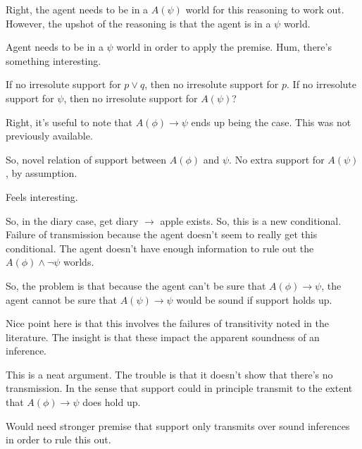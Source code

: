 \documentclass[10pt]{article}
\begin{document}
\begin{note}[Note]
  Right, the agent needs to be in a \(A(\psi)\) world for this reasoning to work out.
  However, the upshot of the reasoning is that the agent is in a \(\psi\) world.

  Agent needs to be in a \(\psi\) world in order to apply the premise.
  Hum, there's something interesting.

  If no irresolute support for \(p \lor q\), then no irresolute support for \(p\).
  If no irresolute support for \(\psi\), then no irresolute support for \(A(\psi)\)?

  Right, it's useful to note that \(A(\phi) \rightarrow \psi\) ends up being the case.
  This was not previously available.

  So, novel relation of support between \(A(\phi)\) and \(\psi\).
  No extra support for \(A(\psi)\), by assumption.

  Feels interesting.

  So, in the diary case, get diary \(\rightarrow\) apple exists.
  So, this is a new conditional.
  Failure of transmission because the agent doesn't seem to really get this conditional.
  The agent doesn't have enough information to rule out the \(A(\phi) \land \lnot\psi\) worlds.

  So, the problem is that because the agent can't be sure that \(A(\phi) \rightarrow \psi\), the agent cannot be sure that \(A(\psi) \rightarrow \psi\) would be sound if support holds up.

  Nice point here is that this involves the failures of transitivity noted in the literature.
  The insight is that these impact the apparent soundness of an inference.

  This is a neat argument.
  The trouble is that it doesn't show that there's no transmission.
  In the sense that support could in principle transmit to the extent that \(A(\phi) \rightarrow \psi\) does hold up.

  Would need stronger premise that support only transmits over sound inferences in order to rule this out.
\end{note}
\end{document}
